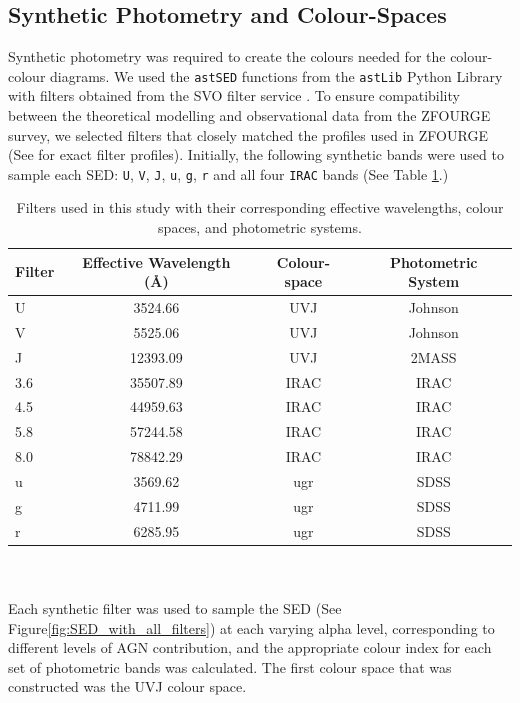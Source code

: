 \subsection{Synthetic Photometry and Colour-Spaces}
Synthetic photometry was required to create the colours needed for the colour-colour diagrams. We used the \texttt{astSED} functions from the \texttt{astLib} Python Library \citep{hilton_astlib_2016} with filters obtained from the SVO filter service \citep{rodrigo_svo_2020}. To ensure compatibility between the theoretical modelling and observational data from the ZFOURGE survey, we selected filters that closely matched the profiles used in ZFOURGE (See \citet{straatman_fourstar_2016} for exact filter profiles). Initially, the following synthetic bands were used to sample each SED: \texttt{U}, \texttt{V}, \texttt{J}, \texttt{u}, \texttt{g}, \texttt{r} and all four \texttt{IRAC} bands (See Table \ref{tab:filters}.)
\begin{table}[h!]
\centering
\caption{Filters used in this study with their corresponding effective wavelengths, colour spaces, and photometric systems.}
\label{tab:filters}
\begin{tabular}{lccc} 
\hline
\textbf{Filter} & \textbf{Effective Wavelength (\AA)} & \textbf{Colour-space} & \textbf{Photometric System} \\ \hline
U & 3524.66 & UVJ & Johnson \\
V & 5525.06 & UVJ & Johnson \\
J & 12393.09 & UVJ & 2MASS \\ 
3.6 & 35507.89 & IRAC & IRAC \\
4.5 & 44959.63 & IRAC & IRAC \\
5.8 & 57244.58 & IRAC & IRAC \\
8.0 & 78842.29 & IRAC & IRAC \\
u & 3569.62 & ugr & SDSS \\
g & 4711.99 & ugr & SDSS \\
r & 6285.95 & ugr & SDSS \\
\hline
\end{tabular}
\end{table}\\\\
Each synthetic filter was used to sample the SED (See Figure\ref{fig:SED_with_all_filters}) at each varying alpha level, corresponding to different levels of AGN contribution, and the appropriate colour index for each set of photometric bands was calculated. The first colour space that was constructed was the UVJ colour space.

